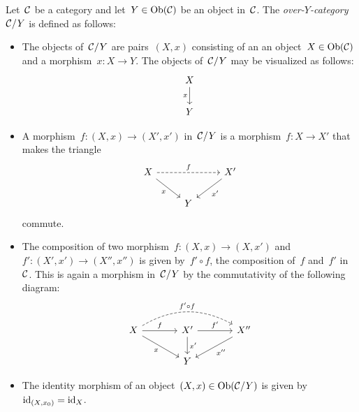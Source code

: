 \begin{remark*}
  Let~$\mathcal{C}$ be a category and let~$Y \in \operatorname{Ob}(\mathcal{C})$ be an object in~$\mathcal{C}$.
  The \emph{over\nobreakdash-$Y$\nobreakdash-category}~$\mathcal{C}/Y$ is defined as follows:
  \begin{itemize}
    \item
      The objects of~$\mathcal{C}/Y$ are pairs~$(X,x)$ consisting of an an object~$X \in \operatorname{Ob}(\mathcal{C})$ and a morphism~$x \colon X \to Y$.
      The objects of~$\mathcal{C}/Y$ may be visualized as follows:
      \[
        \begin{tikzcd}
            X
            \arrow{d}[left]{x}
          \\
            Y
        \end{tikzcd}
      \]
    \item
      A morphism~$f \colon (X,x) \to (X',x')$ in~$\mathcal{C}/Y$ is a morphism~$f \colon X \to X'$ that makes the triangle
      \[
        \begin{tikzcd}
            X
            \arrow[dashed]{rr}[above]{f}
            \arrow{dr}[below left]{x}
          & {}
          & X'
            \arrow{dl}[below right]{x'}
          \\
            {}
          & Y
          & {}
        \end{tikzcd}
      \]
      commute.
    \item
      The composition of two morphism~$f \colon (X,x) \to (X,x')$ and~$f' \colon (X',x') \to (X'',x'')$ is given by~$f' \circ f$, the composition of~$f$ and~$f'$ in~$\mathcal{C}$.
      This is again a morphism in~$\mathcal{C}/Y$ by the commutativity of the following diagram:
      \[
        \begin{tikzcd}[column sep = large]
            X
            \arrow[dashed,bend left]{rr}{f' \circ f}
            \arrow{r}[above]{f}
            \arrow{dr}[below left]{x}
          & X'
            \arrow{r}[above]{f'}
            \arrow{d}[right]{x'}
          & X''
            \arrow{dl}[below right]{x''}
          \\
            {}
          & Y
          & {}
        \end{tikzcd}
      \]
    \item
      The identity morphism of an object~$(X,x) \in \operatorname{Ob}(\mathcal{C}/Y)$ is given by~$\operatorname{id}_{(X,x_0)} = \operatorname{id}_X$.
  \end{itemize}
  

\end{remark*}
